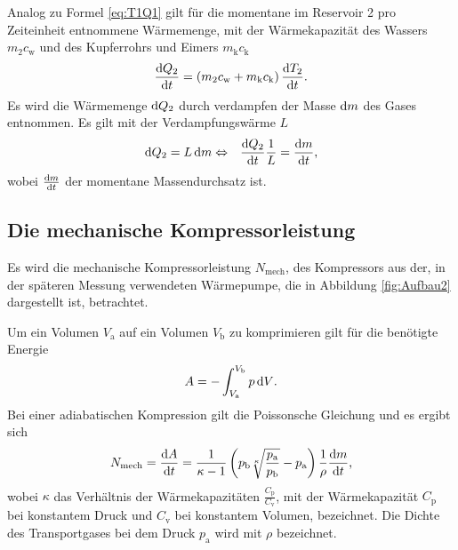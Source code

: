 Analog zu Formel \eqref{eq:T1Q1} gilt für die momentane im Reservoir 2 pro Zeiteinheit entnommene Wärmemenge, mit der Wärmekapazität des Wassers $m_2c_\text{w}$ und des Kupferrohrs und Eimers $m_\text{k}c_\text{k}$
\begin{equation}
\frac{\mathop{}\!\mathrm{d} Q_2}{\mathop{}\!\mathrm{d} t} = \left( m_2c_\text{w} + m_\text{k}c_\text{k}\right) \frac{\mathop{}\!\mathrm{d} T_2}{\mathop{}\!\mathrm{d} t}\label{eq:T2Q2}\text{.}
\end{equation}
Es wird die Wärmemenge $\mathop{}\!\mathrm{d} Q_2$ durch verdampfen der Masse $\mathop{}\!\mathrm{d} m$ des Gases entnommen.
Es gilt mit der Verdampfungswärme $L$
\begin{equation}
\begin{aligned}
\mathop{}\!\mathrm{d} Q_2 = L \mathop{}\!\mathrm{d} m & \Leftrightarrow & \frac{\mathop{}\!\mathrm{d} Q_2}{\mathop{}\!\mathrm{d} t} \frac{1}{L} = \frac{\mathop{}\!\mathrm{d} m}{\mathop{}\!\mathrm{d} t}\text{,}\label{eq:diffmdifft}
\end{aligned}
\end{equation}
wobei $\frac{\mathop{}\!\mathrm{d} m}{\mathop{}\!\mathrm{d} t}$ der momentane Massendurchsatz ist.

\subsection{Die mechanische Kompressorleistung}
Es wird die mechanische Kompressorleistung $N_\text{mech}$, des Kompressors aus der, in der späteren Messung verwendeten Wärmepumpe, die in Abbildung \ref{fig:Aufbau2} dargestellt ist, betrachtet.

Um ein Volumen $V_\text{a}$ auf ein Volumen $V_\text{b}$ zu komprimieren gilt für die benötigte Energie
\begin{eqnarray}
 A= -\int_{V_\text{a}}^{V_\text{b}} p \mathop{}\!\mathrm{d} V\text{.}
\end{eqnarray}
Bei einer adiabatischen Kompression gilt die Poissonsche Gleichung und es ergibt sich
\begin{equation}
N_\text{mech}=\frac{\mathop{}\!\mathrm{d} A}{\mathop{}\!\mathrm{d} t}= \frac{1}{\kappa -1}\left(p_\text{b} \sqrt[\kappa]{\frac{p_\text{a}}{p_\text{b}}} -p_\text{a}\right)\frac{1}{\rho} \frac{\mathop{}\!\mathrm{d} m}{\mathop{}\!\mathrm{d} t}\text{,}\label{eq:Nmech}
\end{equation}
wobei $\kappa$ das Verhältnis der Wärmekapazitäten $\frac{C_\text{p}}{C_\text{v}}$, mit der Wärmekapazität $C_\text{p}$ bei konstantem Druck und ${C_\text{v}}$ bei konstantem Volumen, bezeichnet.
Die Dichte des Transportgases bei dem Druck $p_\text{a}$ wird mit $\rho$ bezeichnet.